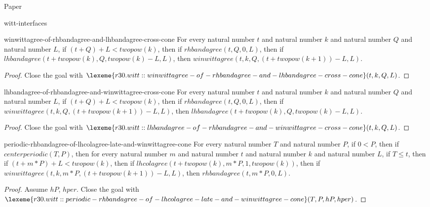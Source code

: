 \begin{lexlean}{Paper}
\begin{section}{witt-interfaces}
  \begin{theorem}{winwittagree-of-rhbandagree-and-lhbandagree-cross-cone}
  For every natural number \(t\) and natural number \(k\) and natural number \(Q\) and natural number \(L\), if \((t + Q) + L < twopow(k)\), then if \(rhbandagree(t, Q, 0, L)\), then if \(lhbandagree(t + twopow(k), Q, twopow(k) - L, L)\), then \(winwittagree(t, k, Q, (t + twopow(k + 1)) - L, L)\).
  \begin{proof}
  Close the goal with \(\lexeme{r30.witt::winwittagree-of-rhbandagree-and-lhbandagree-cross-cone}(t, k, Q, L)\).
  \end{proof}
  \end{theorem}

  \begin{theorem}{lhbandagree-of-rhbandagree-and-winwittagree-cross-cone}
  For every natural number \(t\) and natural number \(k\) and natural number \(Q\) and natural number \(L\), if \((t + Q) + L < twopow(k)\), then if \(rhbandagree(t, Q, 0, L)\), then if \(winwittagree(t, k, Q, (t + twopow(k + 1)) - L, L)\), then \(lhbandagree(t + twopow(k), Q, twopow(k) - L, L)\).
  \begin{proof}
  Close the goal with \(\lexeme{r30.witt::lhbandagree-of-rhbandagree-and-winwittagree-cross-cone}(t, k, Q, L)\).
  \end{proof}
  \end{theorem}

  \begin{theorem}{periodic-rhbandagree-of-lhcolagree-late-and-winwittagree-cone}
  For every natural number \(T\) and natural number \(P\), if \(0 < P\), then if \(centerperiodic(T, P)\), then for every natural number \(m\) and natural number \(t\) and natural number \(k\) and natural number \(L\), if \(T ≤ t\), then if \((t + m * P) + L < twopow(k)\), then if \(lhcolagree(t + twopow(k), m * P, 1, twopow(k))\), then if \(winwittagree(t, k, m * P, (t + twopow(k + 1)) - L, L)\), then \(rhbandagree(t, m * P, 0, L)\).
  \begin{proof}
  Assume \(hP\), \(hper\).
  Close the goal with \(\lexeme{r30.witt::periodic-rhbandagree-of-lhcolagree-late-and-winwittagree-cone}(T, P, hP, hper)\).
  \end{proof}
  \end{theorem}


\end{section}
\end{lexlean}
